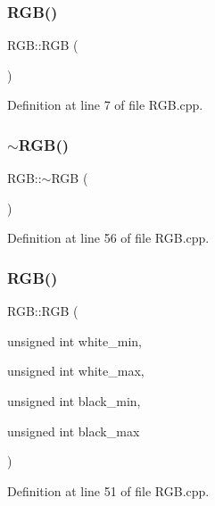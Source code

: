 \subsubsection{\texorpdfstring{R\+G\+B()}{RGB()}\hspace{0.1cm}{\footnotesize\ttfamily [1/2]}}
{\footnotesize\ttfamily R\+G\+B\+::\+R\+GB (\begin{DoxyParamCaption}{ }\end{DoxyParamCaption})}



Definition at line 7 of file R\+G\+B.\+cpp.

\mbox{\label{class_r_g_b_aba3fa8736bbef986a77b56613ddc6275}} 
\subsubsection{\texorpdfstring{$\sim$\+R\+G\+B()}{~RGB()}}
{\footnotesize\ttfamily R\+G\+B\+::$\sim$\+R\+GB (\begin{DoxyParamCaption}{ }\end{DoxyParamCaption})}



Definition at line 56 of file R\+G\+B.\+cpp.

\mbox{\label{class_r_g_b_acd5aafc2415ca6b82089d887e91e2035}} 
\subsubsection{\texorpdfstring{R\+G\+B()}{RGB()}\hspace{0.1cm}{\footnotesize\ttfamily [2/2]}}
{\footnotesize\ttfamily R\+G\+B\+::\+R\+GB (\begin{DoxyParamCaption}\item[{unsigned int}]{white\+\_\+min,  }\item[{unsigned int}]{white\+\_\+max,  }\item[{unsigned int}]{black\+\_\+min,  }\item[{unsigned int}]{black\+\_\+max }\end{DoxyParamCaption})}



Definition at line 51 of file R\+G\+B.\+cpp.



